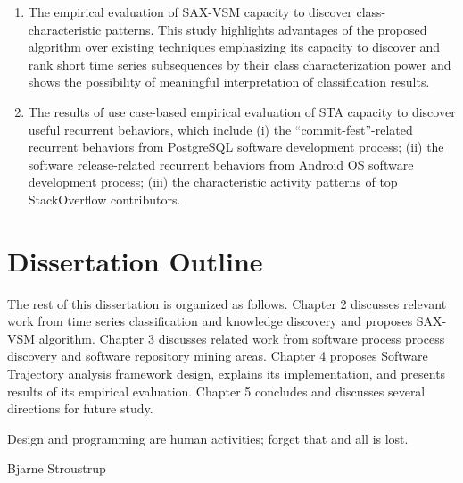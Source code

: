 \begin{enumerate}
\begin{enumerate}
 \item The empirical evaluation of SAX-VSM capacity to discover class-characteristic patterns.
This study highlights advantages of the proposed algorithm over existing techniques 
emphasizing
its capacity to discover and rank short time series subsequences by their class 
characterization power and 
shows the possibility of meaningful interpretation of classification results.
 \item The results of use case-based empirical evaluation of STA capacity to discover useful recurrent 
behaviors, which include 
(i) the ``commit-fest''-related recurrent behaviors from PostgreSQL software development process; 
(ii) the software release-related recurrent behaviors from Android OS software development process;
(iii) the characteristic activity patterns of top StackOverflow contributors.
\end{enumerate}

\end{enumerate}

\section{Dissertation Outline}\label{section_organization}
The rest of this dissertation is organized as follows. 
Chapter 2 discusses relevant work from time series classification and knowledge discovery and proposes SAX-VSM algorithm.
Chapter 3 discusses related work from software process process discovery and software repository mining areas.
Chapter 4 proposes Software Trajectory analysis framework design, explains its implementation, and presents results of its empirical evaluation. 
Chapter 5 concludes and discusses several directions for future study.

\epigraph{Design and programming are human activities; forget that and all is lost.}{Bjarne Stroustrup}